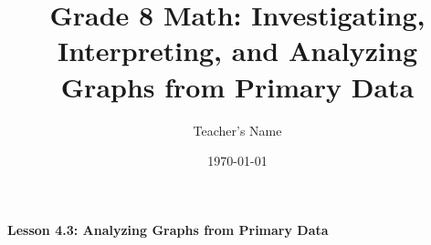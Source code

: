  \begin{center}
\textbf{Lesson 4.3: Analyzing Graphs from Primary Data}
\end{center}

\vspace*{1ex}

\documentclass[12pt]{article}
\usepackage{amsmath,graphicx}

\title{Grade 8 Math: Investigating, Interpreting, and Analyzing Graphs from Primary Data}
\author{Teacher's Name}
\date{\today}



\maketitle

\section*{Lesson Overview}

In this lesson, students will investigate, interpret, and analyze graphs that represent primary data such as examination scores. By analyzing bar graphs, line graphs, pie charts, and histograms, students will learn to extract meaningful insights from the data and draw conclusions.

\section*{Key Terms}
\begin{itemize}
    \item \textbf{Primary Data}: Data collected directly from first-hand sources.
    \item \textbf{Bar Graph}: A chart that presents categorical data with rectangular bars.
    \item \textbf{Line Graph}: A graph that uses lines to connect data points to show trends over time.
    \item \textbf{Pie Chart}: A circular graph divided into slices to show proportional data.
    \item \textbf{Histogram}: A graph showing the distribution of numerical data, where each bar represents a range of data values.
    \item \textbf{Interpretation}: Understanding the message that the graph conveys about the data.
    \item \textbf{Analysis}: Breaking down the graph into its elements to extract key information.
\end{itemize}

